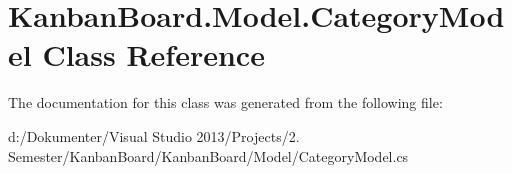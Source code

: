 \hypertarget{class_kanban_board_1_1_model_1_1_category_model}{}\section{Kanban\+Board.\+Model.\+Category\+Model Class Reference}
\label{class_kanban_board_1_1_model_1_1_category_model}


The documentation for this class was generated from the following file\+:\begin{DoxyCompactItemize}
\item 
d\+:/\+Dokumenter/\+Visual Studio 2013/\+Projects/2. Semester/\+Kanban\+Board/\+Kanban\+Board/\+Model/Category\+Model.\+cs\end{DoxyCompactItemize}
